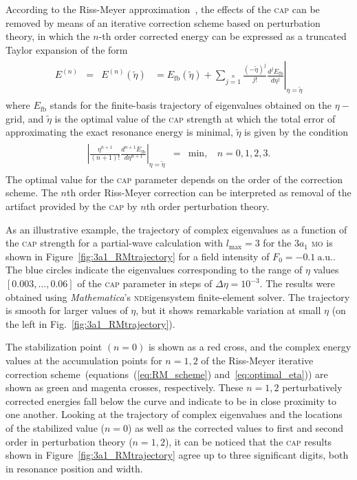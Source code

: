 According to the Riss-Meyer approximation~\cite{RissMeyer_1993}, the
effects of the \textsc{cap} can be removed by means of an iterative
correction scheme based on perturbation theory, in which the $n$-th
order corrected energy can be expressed as a truncated Taylor
expansion of the form
%
\begin{eqnarray}
  \begin{split}
    E^{(n)} & = & E^{(n)}(\tilde{\eta}) & =
    E_{\mathrm{fb}}(\tilde{\eta}) +
    \sum\limits_{j=1}\limits^{n}
    \left.
    \frac{(-\tilde{\eta})^{j}}{j!} \frac{d^{j}E_{\mathrm{fb}}}{d\eta^{j}}
    \right|_{\eta=\tilde{\eta}}
  \end{split}
  \label{eq:RM_scheme}
\end{eqnarray}
%
where $E_{\mathrm{fb}}$ stands for the finite-basis trajectory of
eigenvalues obtained on the $\eta-$grid, and $\tilde{\eta}$ is the
optimal value of the \textsc{cap} strength at which the total error of
approximating the exact resonance energy is minimal, $\tilde{\eta}$ is
given by the condition
%
\begin{eqnarray}
  \begin{split}
    \left| \frac{\eta^{n+1}}{(n + 1)!} \frac{d^{n+1} E_{\mathrm{fb}}}{d\eta^{n+1}}
    \right|_{\eta=\tilde{\eta}} & = & \mathrm{min}, ~~~~ n = 0,1,2,3.
  \end{split}
  \label{eq:optimal_eta}
\end{eqnarray}
%
The optimal value for the \textsc{cap} parameter depends on the order
of the correction scheme. The $n$th order Riss-Meyer correction can be
interpreted as removal of the artifact provided by the \textsc{cap} by
$n$th order perturbation theory.

As an illustrative example, the trajectory of complex eigenvalues as a
function of the \textsc{cap} strength for a partial-wave calculation
with $l_{\mathrm{max}}=3$ for the $3a_{1}$ \textsc{mo} is shown in
Figure~\ref{fig:3a1_RMtrajectory} for a field intensity of $F_{0} =
-0.1\ \mathrm{a.u.}$. The blue circles indicate the eigenvalues
corresponding to the range of $\eta$ values $[0.003, \dots, 0.06]$ of
the \textsc{cap} parameter in steps of $\Delta\eta = 10^{-3}$. The
results were obtained using \emph{Mathematica}'s
\textsc{nde}igensystem finite-element solver. The trajectory is smooth
for larger values of $\eta$, but it shows remarkable variation at
small $\eta$ (on the left in Fig.~\ref{fig:3a1_RMtrajectory}).

The stabilization point $(n = 0)$ is shown as a red cross, and the
complex energy values at the accumulation points for $n = 1, 2$ of the
Riss-Meyer iterative correction scheme~(equations~(\ref{eq:RM_scheme})
and~\ref{eq:optimal_eta})) are shown as green and magenta crosses,
respectively. These $n = 1, 2$ perturbatively corrected energies fall
below the curve and indicate to be in close proximity to one
another. Looking at the trajectory of complex eigenvalues and the
locations of the stabilized value ($n = 0$) as well as the corrected
values to first and second order in perturbation theory ($n = 1, 2$),
it can be noticed that the \textsc{cap} results shown in
Figure~\ref{fig:3a1_RMtrajectory} agree up to three significant
digits, both in resonance position and width.

